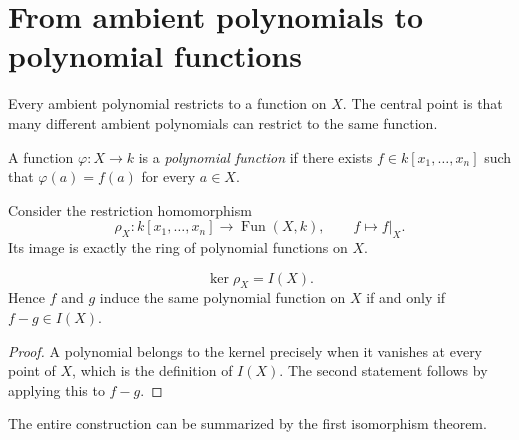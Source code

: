 \section{From ambient polynomials to polynomial functions}
\label{sec:vi03-polynomial-functions}

Every ambient polynomial restricts to a function on \(X\).  The central point is that
many different ambient polynomials can restrict to the same function.

\begin{definition}
A function \(\varphi:X\to k\) is a \emph{polynomial function} if there exists
\(f\in k[x_1,\dots,x_n]\) such that \(\varphi(a)=f(a)\) for every \(a\in X\).
\end{definition}

Consider the restriction homomorphism
\[
\rho_X:k[x_1,\dots,x_n]\longrightarrow \operatorname{Fun}(X,k),
\qquad f\longmapsto f|_X.
\]
Its image is exactly the ring of polynomial functions on \(X\).

\begin{proposition}
\label{prop:vi03-kernel}
\[
\ker\rho_X=I(X).
\]
Hence \(f\) and \(g\) induce the same polynomial function on \(X\) if and only if
\(f-g\in I(X)\).
\end{proposition}

\begin{proof}
A polynomial belongs to the kernel precisely when it vanishes at every point of \(X\),
which is the definition of \(I(X)\).  The second statement follows by applying this to
\(f-g\).
\end{proof}

The entire construction can be summarized by the first isomorphism theorem.

\begin{center}
\end{center}

